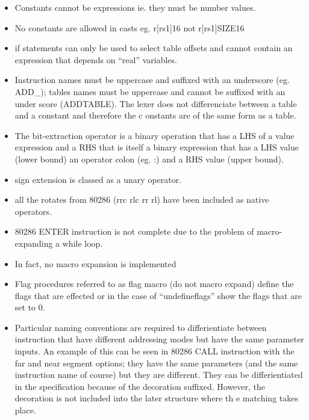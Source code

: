 \begin{itemize}
\item Constants cannot be expressions ie. they must be number values.

\item No constants are allowed in casts eg. r[rs1]{16} not r[rs1]{SIZE16}

\item if statements can only be used to select table offsets and cannot
contain an expression that depends on ``real'' variables. 

\item Instruction names must be uppercase and suffixed with an underscore
(eg. ADD\_); tables names must be uppercase and cannot be suffixed with an
under score (ADDTABLE). The lexer does not differenciate between a table
and a constant and therefore the c onstants are of the same form as a
table. 

\item The bit-extraction operator is a binary operation that has a LHS of
a value expression and a RHS that is itself a binary expression that has a
LHS value (lower bound) an operator colon (eg. :) and a RHS value (upper
bound). 

\item sign extension is classed as a unary operator.

\item all the rotates from 80286 (rrc rlc rr rl) have been included as
native operators. 

\item 80286 ENTER instruction is not complete due to the problem of
macro-expanding a while loop. 

\item In fact, no macro expansion is implemented

\item Flag procedures referred to as flag macro (do not macro expand)
define the flags that are effected or in the case of ``undefineflags''
show the flags that are set to 0. 

\item Particular naming conventions are required to differientiate between
instruction that have different addressing modes but have the same
parameter inputs. An example of this can be seen in 80286 CALL instruction
with the far and near segment options; they have the same parameters (and
the same instruction name of course) but they are different. They can be
differientiated in the specification because of the decoration suffixed.
However, the decoration is not included into the later structure where th
e matching takes place.  
\end{itemize}


